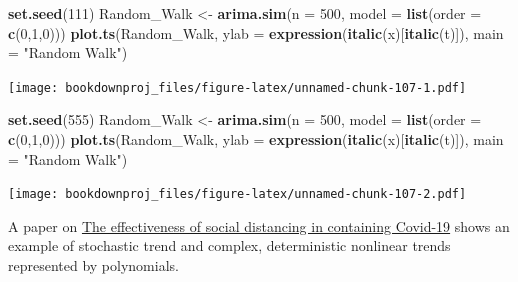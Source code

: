 \documentclass[
]{article}
\newenvironment{Shaded}{\begin{snugshade}}{\end{snugshade}}
\newcommand{\DataTypeTok}[1]{\textcolor[rgb]{0.13,0.29,0.53}{#1}}
\newcommand{\DecValTok}[1]{\textcolor[rgb]{0.00,0.00,0.81}{#1}}
\newcommand{\KeywordTok}[1]{\textcolor[rgb]{0.13,0.29,0.53}{\textbf{#1}}}
\newcommand{\NormalTok}[1]{#1}
\newcommand{\StringTok}[1]{\textcolor[rgb]{0.31,0.60,0.02}{#1}}
\begin{document}
\begin{Shaded}
\begin{Highlighting}[]
\KeywordTok{set.seed}\NormalTok{(}\DecValTok{111}\NormalTok{)}
\NormalTok{Random_Walk <-}\StringTok{ }\KeywordTok{arima.sim}\NormalTok{(}\DataTypeTok{n =} \DecValTok{500}\NormalTok{, }\DataTypeTok{model =} \KeywordTok{list}\NormalTok{(}\DataTypeTok{order =} \KeywordTok{c}\NormalTok{(}\DecValTok{0}\NormalTok{,}\DecValTok{1}\NormalTok{,}\DecValTok{0}\NormalTok{)))}
\KeywordTok{plot.ts}\NormalTok{(Random_Walk, }\DataTypeTok{ylab =} \KeywordTok{expression}\NormalTok{(}\KeywordTok{italic}\NormalTok{(x)[}\KeywordTok{italic}\NormalTok{(t)]), }\DataTypeTok{main =} \StringTok{"Random Walk"}\NormalTok{)}
\end{Highlighting}
\end{Shaded}

\texttt{[image: bookdownproj\_files/figure-latex/unnamed-chunk-107-1.pdf]}

\begin{Shaded}
\begin{Highlighting}[]
\KeywordTok{set.seed}\NormalTok{(}\DecValTok{555}\NormalTok{)}
\NormalTok{Random_Walk <-}\StringTok{ }\KeywordTok{arima.sim}\NormalTok{(}\DataTypeTok{n =} \DecValTok{500}\NormalTok{, }\DataTypeTok{model =} \KeywordTok{list}\NormalTok{(}\DataTypeTok{order =} \KeywordTok{c}\NormalTok{(}\DecValTok{0}\NormalTok{,}\DecValTok{1}\NormalTok{,}\DecValTok{0}\NormalTok{)))}
\KeywordTok{plot.ts}\NormalTok{(Random_Walk, }\DataTypeTok{ylab =} \KeywordTok{expression}\NormalTok{(}\KeywordTok{italic}\NormalTok{(x)[}\KeywordTok{italic}\NormalTok{(t)]), }\DataTypeTok{main =} \StringTok{"Random Walk"}\NormalTok{)}
\end{Highlighting}
\end{Shaded}

\texttt{[image: bookdownproj\_files/figure-latex/unnamed-chunk-107-2.pdf]}

A paper on \href{https://www.tandfonline.com/doi/full/10.1080/00036846.2020.1789061}{The effectiveness of social distancing in containing Covid-19} shows an example of stochastic trend and complex, deterministic nonlinear trends represented by polynomials.
\end{document}

